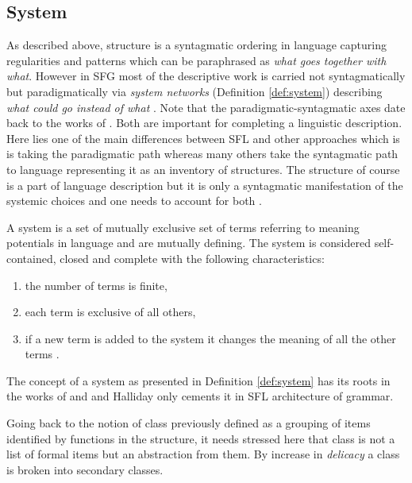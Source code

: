 \subsection{System}
\label{sec:system}
As described above, structure is a syntagmatic ordering in language capturing regularities and patterns which can be paraphrased as \textit{what goes together with what}. However in SFG most of the descriptive work is carried not syntagmatically but paradigmatically via \textit{system networks} (Definition \ref{def:system}) describing \textit{what could go instead of what} \citep[22]{Halliday2013}. Note that the paradigmatic-syntagmatic axes date back to the works of \citet{Saussure15}. Both are important for completing a linguistic description. Here lies one of the main differences between SFL and other approaches which is is taking the paradigmatic path whereas many others take the syntagmatic path to language representing it as an inventory of structures. 
The structure of course is a part of language description but it is only a syntagmatic manifestation of the systemic choices and one needs to account for both \citep[23]{Halliday2013}.

\begin{definition}[System]\label{def:system}
	A system is a set of mutually exclusive set of terms referring to meaning potentials in language and are mutually defining. The system is considered self-contained, closed and complete with the following characteristics:
	\begin{enumerate}
		\item the number of terms is finite,
		\item each term is exclusive of all others,
		\item if a new term is added to the system it changes the meaning of all the other terms \citet[41]{Halliday2002}.
	\end{enumerate}
\end{definition}

The concept of a system as presented in Definition \ref{def:system} has its roots in the works of \citet{Saussure15} and \citet{Hjelmslev53} and Halliday only cements it in SFL architecture of grammar.

Going back to the notion of class previously defined as a grouping of items identified by functions in the structure, it needs stressed here that class is not a list of formal items but an abstraction from them. By increase in \textit{delicacy} a class is broken into secondary classes. 

